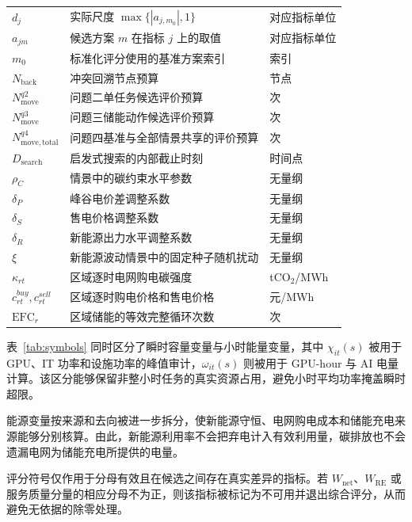\documentclass[withoutpreface,bwprint]{cumcmthesis}
\begin{document}
{\begin{longtable}{lll}
$d_j$ & 实际尺度 $\max\{|a_{j,m_0}|,1\}$ & 对应指标单位 \\
$a_{jm}$ & 候选方案 $m$ 在指标 $j$ 上的取值 & 对应指标单位 \\
$m_0$ & 标准化评分使用的基准方案索引 & 索引 \\
$N_{\mathrm{back}}$ & 冲突回溯节点预算 & 节点 \\
$N_{\mathrm{move}}^{q2}$ & 问题二单任务候选评价预算 & 次 \\
$N_{\mathrm{move}}^{q3}$ & 问题三储能动作候选评价预算 & 次 \\
$N_{\mathrm{move,total}}^{q4}$ & 问题四基准与全部情景共享的评价预算 & 次 \\
$D_{\mathrm{search}}$ & 启发式搜索的内部截止时刻 & 时间点 \\
$\rho_C$ & 情景中的碳约束水平参数 & 无量纲 \\
$\delta_P$ & 峰谷电价差调整系数 & 无量纲 \\
$\delta_S$ & 售电价格调整系数 & 无量纲 \\
$\delta_R$ & 新能源出力水平调整系数 & 无量纲 \\
$\xi$ & 新能源波动情景中的固定种子随机扰动 & 无量纲 \\
$\kappa_{rt}$ & 区域逐时电网购电碳强度 & tCO$_2$/MWh \\
$c_{rt}^{buy},c_{rt}^{sell}$ & 区域逐时购电价格和售电价格 & 元/MWh \\
$\mathrm{EFC}_r$ & 区域储能的等效完整循环次数 & 次 \\
\end{longtable}
}

表~\ref{tab:symbols} 同时区分了瞬时容量变量与小时能量变量，其中 $\chi_{it}(s)$ 被用于 GPU、IT 功率和设施功率的峰值审计，$\omega_{it}(s)$ 则被用于 GPU-hour 与 AI 电量计算。该区分能够保留非整小时任务的真实资源占用，避免小时平均功率掩盖瞬时超限。

能源变量按来源和去向被进一步拆分，使新能源守恒、电网购电成本和储能充电来源能够分别核算。由此，新能源利用率不会把弃电计入有效利用量，碳排放也不会遗漏电网为储能充电所提供的电量。

评分符号仅作用于分母有效且在候选之间存在真实差异的指标。若 $W_{\mathrm{net}}$、$W_{\mathrm{RE}}$ 或服务质量分量的相应分母不为正，则该指标被标记为不可用并退出综合评分，从而避免无依据的除零处理。

\end{document}
